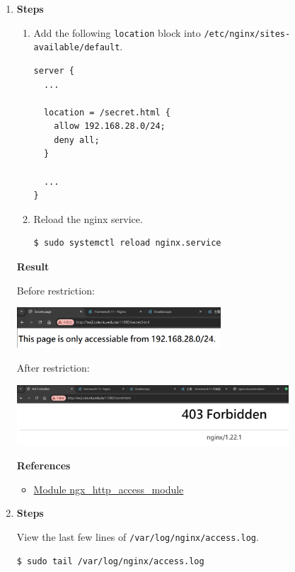 \documentclass[12pt, a4paper]{article}
\begin{document}
\begin{enumerate}[resume]
    \pagebreak
    \item \textbf{Steps}
    \begin{enumerate}[label=(\arabic*)]
      \item Add the following \verb|location| block into
      \verb|/etc/nginx/sites-available/default|.
      \begin{Verbatim}[frame=single]
server {
  ...

  location = /secret.html {
    allow 192.168.28.0/24;
    deny all;
  }

  ...
}
      \end{Verbatim}

      \item Reload the nginx service.
      \begin{Verbatim}[frame=single]
$ sudo systemctl reload nginx.service
      \end{Verbatim}
    \end{enumerate}

    \textbf{Result}

    Before restriction:

    \includegraphics[width=0.6\textwidth]{10_result_before.png}

    \vspace{\baselineskip}
    After restriction:

    \includegraphics[width=0.8\textwidth]{10_result_after.png}

    \vspace{\baselineskip}
    \textbf{References}
    \begin{itemize}
      \item \href{https://nginx.org/en/docs/http/ngx_http_access_module.html}{Module ngx\_http\_access\_module}
    \end{itemize}

    \pagebreak
    \item \textbf{Steps}

    View the last few lines of \verb|/var/log/nginx/access.log|.
    \begin{Verbatim}[frame=single]
$ sudo tail /var/log/nginx/access.log
    \end{Verbatim}


\end{enumerate}
\end{document}
